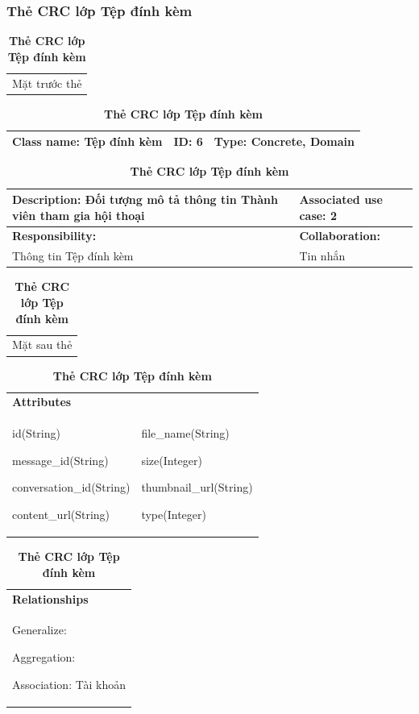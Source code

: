   \subsubsection{Thẻ CRC lớp Tệp đính kèm}
  \begin{table}[H]
    \caption{\bfseries \fontsize{12pt}{0pt}\selectfont Thẻ CRC lớp Tệp đính kèm}
    \centering
    \begin{tabularx}{0.9\textwidth}{X}
      Mặt trước thẻ
    \end{tabularx}
    \begin{tabularx}{0.9\textwidth}{|X|X|X|}
      \hline
      \textbf{Class name:} Tệp đính kèm & \textbf{ID:} 6 & \textbf{Type:} Concrete, Domain \\
      \hline
    \end{tabularx}
    \begin{tabularx}{0.9\textwidth}{|X|X|}
      \textbf{Description:} Đối tượng mô tả thông tin Thành viên tham gia hội thoại & \textbf{Associated use case:} 2 \\
      \hline
      \textbf{Responsibility:} & \textbf{Collaboration:} \\
      Thông tin Tệp đính kèm
      & 
      Tin nhắn
      \\
      \hline
    \end{tabularx}
    \begin{tabularx}{0.9\textwidth}{X}
      Mặt sau thẻ
    \end{tabularx}
    \begin{tabularx}{0.9\textwidth}{|X|X|}
      \hline
      \textbf{Attributes} & \\
      id(String) 
      
      message\_id(String)

      conversation\_id(String)

      content\_url(String)
      &
      file\_name(String)

      size(Integer)

      thumbnail\_url(String)

      type(Integer)
      \\
      \hline
    \end{tabularx}
    \begin{tabularx}{0.9\textwidth}{|X|}
      \textbf{Relationships} \\
      Generalize:  

      Aggregation:  
      
      Association: Tài khoản 
      \\
      \hline
    \end{tabularx}
  \end{table}

